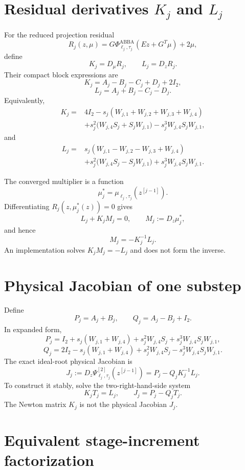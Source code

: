 \documentclass[11pt,a4paper]{article}
\newcommand{\Id}{I}
\begin{document}
\section{Residual derivatives \texorpdfstring{$K_j$}{Kj} and \texorpdfstring{$L_j$}{Lj}}

For the reduced projection residual
\[
 R_j(z,\mu)
 =G\Phi^{\mathrm{ABBA}}_{\ell_j,\tau_j}(Ez+G^T\mu)+2\mu,
\]
define
\[
 K_j=D_\mu R_j,
 \qquad
 L_j=D_zR_j.
\]
Their compact block expressions are
\[
 \boxed{
 K_j=A_j-B_j-C_j+D_j+2\Id_2,
 }
\]
\[
 \boxed{
 L_j=A_j+B_j-C_j-D_j.
 }
\]
Equivalently,
\[
 \boxed{
 \begin{aligned}
 K_j={}&4\Id_2-s_j(W_{j,1}+W_{j,2}+W_{j,3}+W_{j,4})\\
 &+s_j^2\bigl(W_{j,4}S_j+S_jW_{j,1}\bigr)
 -s_j^3W_{j,4}S_jW_{j,1},
 \end{aligned}
 }
\]
and
\[
 \boxed{
 \begin{aligned}
 L_j={}&s_j(W_{j,1}-W_{j,2}-W_{j,3}+W_{j,4})\\
 &+s_j^2\bigl(W_{j,4}S_j-S_jW_{j,1}\bigr)
 +s_j^3W_{j,4}S_jW_{j,1}.
 \end{aligned}
 }
\]

The converged multiplier is a function
\[
 \mu_j^*=\mu_{\ell_j,\tau_j}(z^{[j-1]}).
\]
Differentiating
\(
 R_j(z,\mu_j^*(z))=0
\)
gives
\[
 L_j+K_jM_j=0,
 \qquad
 M_j:=D_z\mu_j^*,
\]
and hence
\[
 \boxed{M_j=-K_j^{-1}L_j.}
\]
An implementation solves $K_jM_j=-L_j$ and does not form the inverse.

\section{Physical Jacobian of one substep}

Define
\[
 P_j=A_j+B_j,
 \qquad
 Q_j=A_j-B_j+\Id_2.
\]
In expanded form,
\[
 P_j=\Id_2+s_j(W_{j,1}+W_{j,4})
 +s_j^2W_{j,4}S_j+s_j^3W_{j,4}S_jW_{j,1},
\]
\[
 Q_j=2\Id_2-s_j(W_{j,1}+W_{j,4})
 +s_j^2W_{j,4}S_j-s_j^3W_{j,4}S_jW_{j,1}.
\]
The exact ideal-root physical Jacobian is
\[
 \boxed{
 J_j
 :=D_z\Psi^{[2]}_{\ell_j,\tau_j}(z^{[j-1]})
 =P_j-Q_jK_j^{-1}L_j.
 }
\]
To construct it stably, solve the two-right-hand-side system
\[
 K_jT_j=L_j,
 \qquad
 J_j=P_j-Q_jT_j.
\]
The Newton matrix $K_j$ is not the physical Jacobian $J_j$.

\section{Equivalent stage-increment factorization}
\end{document}
